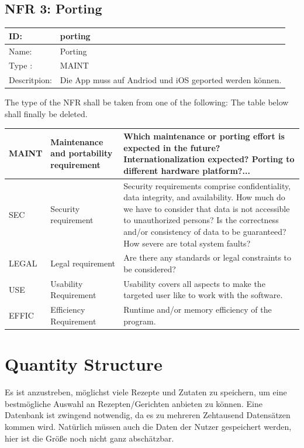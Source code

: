 \documentclass[12pt]{article}
\theoremstyle{definition}
\begin{document}
\subsection{NFR 3: Porting }
\begin{tabular}{|p{.2\linewidth}|p{.65\linewidth}|}
\hline 
ID: &  porting\\ \hline
Name: & Porting \\ \hline
Type	: & MAINT \\ \hline
Descritpion: & Die App muss auf Andriod und iOS geported werden können.  \\ \hline
\end{tabular}

The type of the NFR shall be taken from one of the following: The table below shall finally be deleted.

\begin{tabular}{|p{.15\linewidth}|p{.25\linewidth}|p{.4\linewidth}|}
\hline
MAINT & Maintenance and portability requirement & Which maintenance or porting effort is expected in the future? Internationalization expected? Porting to different hardware platform?... \\ \hline
SEC & Security requirement & Security requirements comprise confidentiality, data integrity, and availability. How much do we have to consider that data is not accessible to unauthorized persons? Is the correctness and/or consistency of data to be guaranteed? How severe are total system faults? \\ \hline
LEGAL & Legal requirement & Are there any standards or legal constraints to be considered? \\ \hline
USE & Usability Requirement & Usability covers all aspects to make the targeted user like to work with the software. \\ \hline
EFFIC & Efficiency Requirement & Runtime and/or memory efficiency of the program. \\ \hline
\end{tabular}
\pagebreak

\section{Quantity Structure}
Es ist anzustreben, möglichst viele Rezepte und Zutaten zu speichern, um eine bestmögliche Auswahl an Rezepten/Gerichten anbieten zu können. Eine Datenbank ist zwingend notwendig, da es zu mehreren Zehtausend Datensätzen kommen wird. Natürlich müssen auch die Daten der Nutzer gespeichert werden, hier ist die Größe noch nicht ganz abschätzbar.
\end{document}
